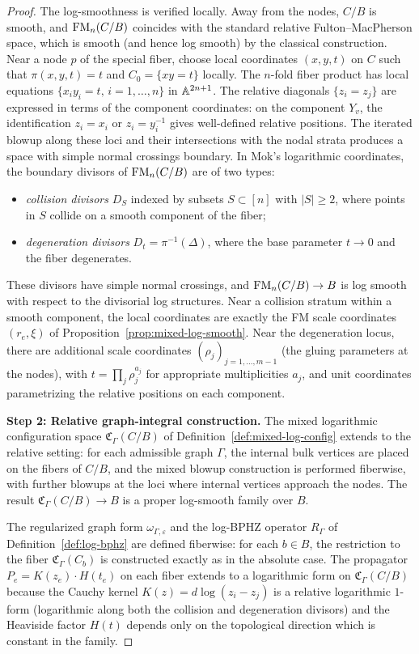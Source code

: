 \begin{proof}
The log-smoothness is verified locally. Away from the nodes, $C/B$ is smooth, and $\FM_n(C/B)$ coincides with the standard relative Fulton--MacPherson space, which is smooth (and hence log smooth) by the classical construction. Near a node $p$ of the special fiber, choose local coordinates $(x, y, t)$ on $C$ such that $\pi(x,y,t) = t$ and $C_0 = \{xy = t\}$ locally. The $n$-fold fiber product has local equations $\{x_i y_i = t,\, i = 1, \ldots, n\}$ in $\AA^{2n+1}$. The relative diagonals $\{z_i = z_j\}$ are expressed in terms of the component coordinates: on the component $Y_v$, the identification $z_i = x_i$ or $z_i = y_i^{-1}$ gives well-defined relative positions. The iterated blowup along these loci and their intersections with the nodal strata produces a space with simple normal crossings boundary. In Mok's logarithmic coordinates, the boundary divisors of $\FM_n(C/B)$ are of two types:
\begin{itemize}
 \item \emph{collision divisors} $D_S$ indexed by subsets $S \subset [n]$ with $|S| \ge 2$, where points in $S$ collide on a smooth component of the fiber;
 \item \emph{degeneration divisors} $D_t = \pi^{-1}(\Delta)$, where the base parameter $t \to 0$ and the fiber degenerates.
\end{itemize}
These divisors have simple normal crossings, and $\FM_n(C/B) \to B$ is log smooth with respect to the divisorial log structures. Near a collision stratum within a smooth component, the local coordinates are exactly the FM scale coordinates $(r_e, \xi)$ of Proposition~\ref{prop:mixed-log-smooth}. Near the degeneration locus, there are additional scale coordinates $(\rho_j)_{j=1,\ldots,m-1}$ (the gluing parameters at the nodes), with $t = \prod_j \rho_j^{a_j}$ for appropriate multiplicities $a_j$, and unit coordinates parametrizing the relative positions on each component.

\medskip
\textbf{Step 2: Relative graph-integral construction.}
The mixed logarithmic configuration space $\mathfrak C_\Gamma(C/B)$ of Definition~\ref{def:mixed-log-config} extends to the relative setting: for each admissible graph $\Gamma$, the internal bulk vertices are placed on the fibers of $C/B$, and the mixed blowup construction is performed fiberwise, with further blowups at the loci where internal vertices approach the nodes. The result $\mathfrak C_\Gamma(C/B) \to B$ is a proper log-smooth family over $B$.

The regularized graph form $\omega_{\Gamma,\varepsilon}$ and the log-BPHZ operator $R_\Gamma$ of Definition~\ref{def:log-bphz} are defined fiberwise: for each $b \in B$, the restriction to the fiber $\mathfrak C_\Gamma(C_b)$ is constructed exactly as in the absolute case. The propagator $P_e = K(z_e) \cdot H(t_e)$ on each fiber extends to a logarithmic form on $\mathfrak C_\Gamma(C/B)$ because the Cauchy kernel $K(z) = d\log(z_i - z_j)$ is a relative logarithmic $1$-form (logarithmic along both the collision and degeneration divisors) and the Heaviside factor $H(t)$ depends only on the topological direction which is constant in the family.


\end{proof}
